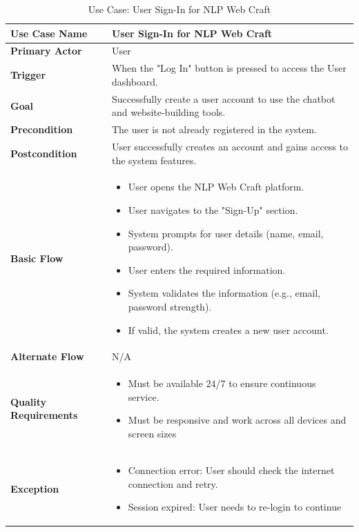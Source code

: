 \documentclass[12pt]{report}
\begin{document}
\vspace{10pt}

\begin{table}[h!]

\begin{tabular}{|p{3.5cm}|p{10cm}|}
\hline
\textbf{Use Case Name} & User Sign-In for NLP Web Craft \\ 
\hline
\textbf{Primary Actor} & User  \\ 
\hline
\textbf{Trigger} & When the "Log In" button is pressed to access the User dashboard. \\ 
\hline
\textbf{Goal} & Successfully create a user account to use the chatbot and website-building tools. \\ 
\hline
\textbf{Precondition} & The user is not already registered in the system. \\ 
\hline
\textbf{Postcondition} & User successfully creates an account and gains access to the system features. \\ 
\hline

\textbf{Basic Flow} & 
\begin{itemize}
    \item User opens the NLP Web Craft platform.
    \item User navigates to the "Sign-Up" section.
    \item System prompts for user details (name, email, password).
    \item User enters the required information.
    \item System validates the information (e.g., email, password strength).
    \item If valid, the system creates a new user account.
\end{itemize} \\ 
\hline
\textbf{Alternate Flow} & N/A \\ 
\hline
\textbf{Quality Requirements} & 
\begin{itemize}
    \item Must be available 24/7 to ensure continuous service.
    \item Must be responsive and work across all devices and screen sizes
\end{itemize} \\ 
\hline
\textbf{Exception} & 
\begin{itemize}
    \item Connection error: User should check the internet connection and retry.
    \item Session expired: User needs to re-login to continue
\end{itemize} \\ 
\hline
\end{tabular}

\caption{Use Case: User Sign-In for NLP Web Craft}
\end{table}
\end{document}
